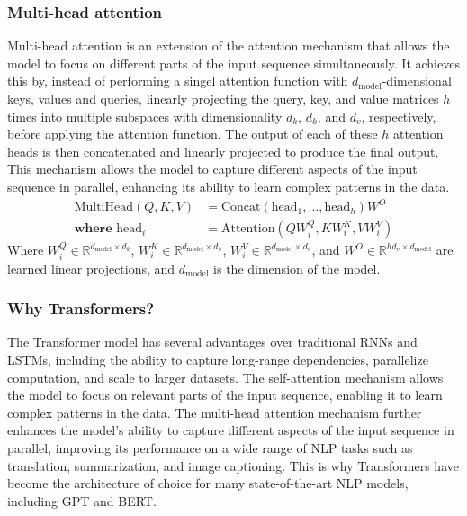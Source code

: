             \subsubsection{Multi-head attention}
                Multi-head attention is an extension of the attention mechanism that allows the model to focus on different parts of the input sequence simultaneously. It achieves this by, instead of performing a singel attention function with \(d_{\text{model}}\)-dimensional keys, values and queries, linearly projecting the query, key, and value matrices \(h\) times into multiple subspaces with dimensionality \(d_k\), \(d_k\), and \(d_v\), respectively, before applying the attention function. The output of each of these \(h\) attention heads is then concatenated and linearly projected to produce the final output. This mechanism allows the model to capture different aspects of the input sequence in parallel, enhancing its ability to learn complex patterns in the data.
                \begin{align}
                    \text{MultiHead}(Q, K, V) &= \text{Concat}(\text{head}_1, \ldots, \text{head}_h)W^O \\
                    \textbf{where } \text{head}_i &= \text{Attention}(QW_i^Q, KW_i^K, VW_i^V)
                \end{align}
                Where \(W_i^Q \in \mathbb{R}^{d_{\text{model}} \times d_k}\), \(W_i^K \in \mathbb{R}^{d_{\text{model}} \times d_k}\), \(W_i^V \in \mathbb{R}^{d_{\text{model}} \times d_v}\), and \(W^O \in \mathbb{R}^{hd_v \times d_{\text{model}}}\) are learned linear projections, and \(d_{\text{model}}\) is the dimension of the model.

            \subsubsection{Why Transformers?}
                The Transformer model has several advantages over traditional RNNs and LSTMs, including the ability to capture long-range dependencies, parallelize computation, and scale to larger datasets. The self-attention mechanism allows the model to focus on relevant parts of the input sequence, enabling it to learn complex patterns in the data. The multi-head attention mechanism further enhances the model's ability to capture different aspects of the input sequence in parallel, improving its performance on a wide range of NLP tasks such as translation, summarization, and image captioning. This is why Transformers have become the architecture of choice for many state-of-the-art NLP models, including GPT and BERT.

